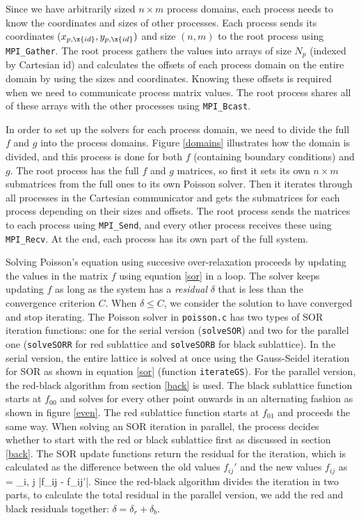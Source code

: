 \documentclass[10pt]{article}
\begin{document}
Since we have arbitrarily sized $n \times m$ process domains, each process needs to know the coordinates and sizes of other processes. Each process sends its coordinates $(x_{p, \x{id}}, y_{p, \x{id}})$ and size $(n, m)$ to the root process using \verb|MPI_Gather|. The root process gathers the values into arrays of size $N_p$ (indexed by Cartesian id) and calculates the offsets of each process domain on the entire domain by using the sizes and coordinates. Knowing these offsets is required when we need to communicate process matrix values. The root process shares all of these arrays with the other processes using \verb|MPI_Bcast|.

In order to set up the solvers for each process domain, we need to divide the full $f$ and $g$ into the process domains. Figure \ref{domains} illustrates how the domain is divided, and this process is done for both $f$ (containing boundary conditions) and $g$. The root process has the full $f$ and $g$ matrices, so first it sets its own $n \times m$ submatrices from the full ones to its own Poisson solver. Then it iterates through all processes in the Cartesian communicator and gets the submatrices for each process depending on their sizes and offsets. The root process sends the matrices to each process using \verb|MPI_Send|, and every other process receives these using \verb|MPI_Recv|. At the end, each process has its own part of the full system.

Solving Poisson's equation using succesive over-relaxation proceeds by updating the values in the matrix $f$ using equation \ref{sor} in a loop. The solver keeps updating $f$ as long as the system has a \textit{residual} $\delta$ that is less than the convergence criterion $C$. When $\delta \leq C$, we consider the solution to have converged and stop iterating. The Poisson solver in \verb|poisson.c| has two types of SOR iteration functions: one for the serial version (\verb|solveSOR|) and two for the parallel one (\verb|solveSORR| for red sublattice and \verb|solveSORB| for black sublattice). In the serial version, the entire lattice is solved at once using the Gauss-Seidel iteration for SOR as shown in equation \ref{sor} (function \verb|iterateGS|). For the parallel version, the red-black algorithm from section \ref{back} is used. The black sublattice function starts at $f_{00}$ and solves for every other point onwards in an alternating fashion as shown in figure \ref{even}. The red sublattice function starts at $f_{01}$ and proceeds the same way. When solving an SOR iteration in parallel, the process decides whether to start with the red or black sublattice first as discussed in section \ref{back}. The SOR update functions return the residual for the iteration, which is calculated as the difference between the old values $f_{ij}'$ and the new values $f_{ij}$ as
\bna
\delta = \sum_{i, j} |f_{ij} - f_{ij}'|.
\ena
Since the red-black algorithm divides the iteration in two parts, to calculate the total residual in the parallel version, we add the red and black residuals together: $\delta = \delta_r + \delta_b$.
\end{document}
